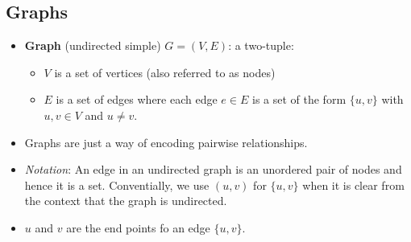 \subsection{Graphs}
\begin{itemize}
    \item \textbf{Graph} (undirected simple) $G = (V, E)$: a two-tuple:
    \begin{itemize}
        \item $V$ is a set of vertices (also referred to as nodes)
        \item $E$ is a set of edges where each edge $e \in E$ is a set of the form $\{ u, v \}$ with $u, v \in V$ and $u \neq v$.
    \end{itemize}
    \item Graphs are just a way of encoding pairwise relationships.
    \item \textit{Notation}: An edge in an undirected graph is an unordered pair of nodes and hence it is a set. Conventially, we use $(u, v)$ for $\{ u, v \}$ when it is clear from the context that the graph is undirected.
    \item $u$ and $v$ are the end points fo an edge $\{ u, v \}$.
\end{itemize}

